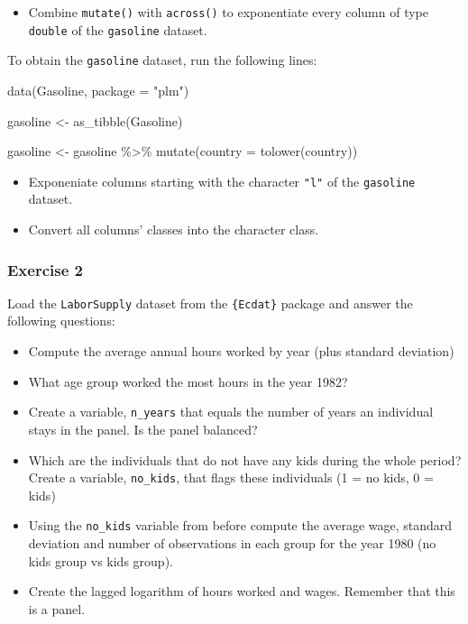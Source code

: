 \documentclass[
]{article}
\newenvironment{Shaded}{\begin{snugshade}}{\end{snugshade}}
\newcommand{\AttributeTok}[1]{\textcolor[rgb]{0.77,0.63,0.00}{#1}}
\newcommand{\FunctionTok}[1]{\textcolor[rgb]{0.00,0.00,0.00}{#1}}
\newcommand{\NormalTok}[1]{#1}
\newcommand{\OtherTok}[1]{\textcolor[rgb]{0.56,0.35,0.01}{#1}}
\newcommand{\SpecialCharTok}[1]{\textcolor[rgb]{0.00,0.00,0.00}{#1}}
\newcommand{\StringTok}[1]{\textcolor[rgb]{0.31,0.60,0.02}{#1}}
\providecommand{\tightlist}{%
  \setlength{\itemsep}{0pt}\setlength{\parskip}{0pt}}
\begin{document}
\begin{itemize}
\tightlist
\item
  Combine \texttt{mutate()} with \texttt{across()} to exponentiate every column of type \texttt{double} of the \texttt{gasoline} dataset.
\end{itemize}

To obtain the \texttt{gasoline} dataset, run the following lines:

\begin{Shaded}
\begin{Highlighting}[]
\FunctionTok{data}\NormalTok{(Gasoline, }\AttributeTok{package =} \StringTok{"plm"}\NormalTok{)}

\NormalTok{gasoline }\OtherTok{\textless{}{-}} \FunctionTok{as\_tibble}\NormalTok{(Gasoline)}

\NormalTok{gasoline }\OtherTok{\textless{}{-}}\NormalTok{ gasoline }\SpecialCharTok{\%\textgreater{}\%}
  \FunctionTok{mutate}\NormalTok{(}\AttributeTok{country =} \FunctionTok{tolower}\NormalTok{(country))}
\end{Highlighting}
\end{Shaded}

\begin{itemize}
\item
  Exponeniate columns starting with the character \texttt{"l"} of the \texttt{gasoline} dataset.
\item
  Convert all columns' classes into the character class.
\end{itemize}

\hypertarget{exercise-2-1}{%
\subsubsection*{Exercise 2}\label{exercise-2-1}}

Load the \texttt{LaborSupply} dataset from the \texttt{\{Ecdat\}} package and answer the following questions:

\begin{itemize}
\tightlist
\item
  Compute the average annual hours worked by year (plus standard deviation)
\item
  What age group worked the most hours in the year 1982?
\item
  Create a variable, \texttt{n\_years} that equals the number of years an individual stays in the panel. Is the panel balanced?
\item
  Which are the individuals that do not have any kids during the whole period? Create a variable, \texttt{no\_kids}, that flags these individuals (1 = no kids, 0 = kids)
\item
  Using the \texttt{no\_kids} variable from before compute the average wage, standard deviation and number of observations in each group for the year 1980 (no kids group vs kids group).
\item
  Create the lagged logarithm of hours worked and wages. Remember that this is a panel.
\end{itemize}
\end{document}
